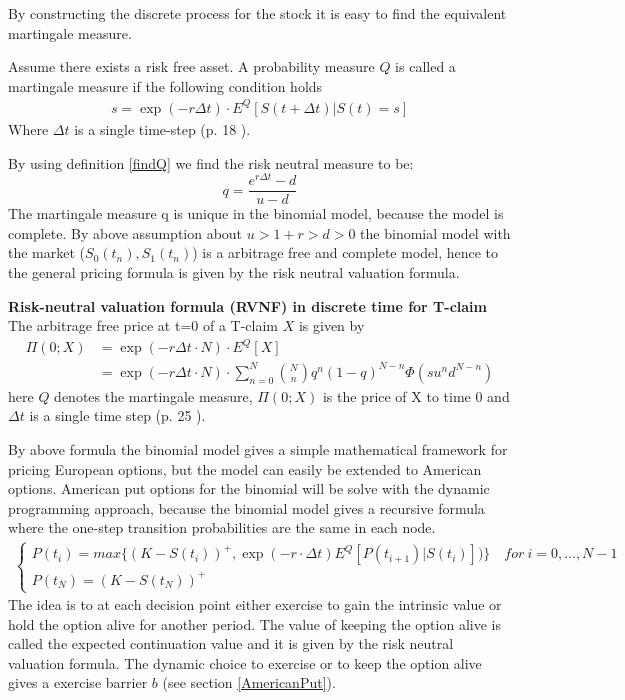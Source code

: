 By constructing the discrete process for the stock it is easy to find the equivalent martingale measure. 
\begin{definition}\label{findQ}
Assume there exists a risk free asset. A probability measure $Q$ is called a martingale measure if the following condition holds 
\begin{align}
s= \exp(- r \Delta t) \cdot E^Q[S(t+\Delta t)|S(t)=s] 
\end{align}
Where $\Delta t$ is a single time-step (p. 18 \parencite{Bjork19}).
\end{definition}
By using definition \ref{findQ} we find the risk neutral measure to be:
$$q=\frac{e^{r \Delta t}-d}{u-d}$$
The martingale measure q is unique in the binomial model, because the model is complete. By above assumption about $u>1+r>d>0$ the binomial model with the market ($S_0(t_n), S_1(t_n)$) is a arbitrage free and complete model, hence to the general pricing formula is given by the risk neutral valuation formula.
\begin{theorem}\label{RNVF-Discrete}
\textbf{Risk-neutral valuation formula (RVNF) in discrete time for T-claim}
The arbitrage free price at t=0 of a T-claim $X$ is given by
\begin{align}
\Pi(0;X)&= \exp(- r \Delta t \cdot N) \cdot E^Q[X]\\
&=\exp(- r \Delta t \cdot N) \cdot \sum_{n=0}^{N} \binom{N}{n} q^n (1-q)^{N-n} \Phi(su^n d^{N-n})
\end{align}
here $Q$ denotes the martingale measure, $\Pi(0;X)$ is the price of X to time 0 and $\Delta t$ is a single time step (p. 25 \parencite{Bjork19}).
\end{theorem}

By above formula the binomial model gives a simple mathematical framework for pricing European options, but the model can easily be extended to American options. American put options for the binomial will be solve with the dynamic programming approach, because the binomial model gives a recursive formula where the one-step transition probabilities are the same in each node.
\begin{equation}\label{BellmanEq2}
\begin{split}
\begin{cases}
          P(t_i) = max\{ (K-S(t_i))^+, \exp(-r\cdot \Delta t) E^Q[P(t_{i+1})|S(t_i)])\} \quad for \ i={0,\ldots,N-1} \\
          P(t_N) = (K-S(t_N))^+ 
\end{cases}
\end{split}
\end{equation}
The idea is to at each decision point either exercise to gain the intrinsic value or hold the option alive for another period. The value of keeping the option alive is called the expected continuation value and it is given by the risk neutral valuation formula. The dynamic choice to exercise or to keep the option alive gives a exercise barrier $b$ (see section \ref{AmericanPut}).\\

